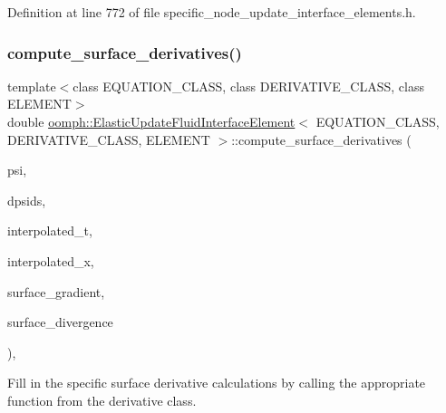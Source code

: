Definition at line 772 of file specific\+\_\+node\+\_\+update\+\_\+interface\+\_\+elements.\+h.

\mbox{\label{classoomph_1_1ElasticUpdateFluidInterfaceElement_ae9df6c11ccb63dc04c0d5ca655fe1482}} 
\subsubsection{\texorpdfstring{compute\+\_\+surface\+\_\+derivatives()}{compute\_surface\_derivatives()}}
{\footnotesize\ttfamily template$<$class E\+Q\+U\+A\+T\+I\+O\+N\+\_\+\+C\+L\+A\+SS, class D\+E\+R\+I\+V\+A\+T\+I\+V\+E\+\_\+\+C\+L\+A\+SS, class E\+L\+E\+M\+E\+NT$>$ \\
double \hyperlink{classoomph_1_1ElasticUpdateFluidInterfaceElement}{oomph\+::\+Elastic\+Update\+Fluid\+Interface\+Element}$<$ E\+Q\+U\+A\+T\+I\+O\+N\+\_\+\+C\+L\+A\+SS, D\+E\+R\+I\+V\+A\+T\+I\+V\+E\+\_\+\+C\+L\+A\+SS, E\+L\+E\+M\+E\+NT $>$\+::compute\+\_\+surface\+\_\+derivatives (\begin{DoxyParamCaption}\item[{const \hyperlink{classoomph_1_1Shape}{Shape} \&}]{psi,  }\item[{const \hyperlink{classoomph_1_1DShape}{D\+Shape} \&}]{dpsids,  }\item[{const \hyperlink{classoomph_1_1DenseMatrix}{Dense\+Matrix}$<$ double $>$ \&}]{interpolated\+\_\+t,  }\item[{const \hyperlink{classoomph_1_1Vector}{Vector}$<$ double $>$ \&}]{interpolated\+\_\+x,  }\item[{\hyperlink{classoomph_1_1DShape}{D\+Shape} \&}]{surface\+\_\+gradient,  }\item[{\hyperlink{classoomph_1_1DShape}{D\+Shape} \&}]{surface\+\_\+divergence }\end{DoxyParamCaption})\hspace{0.3cm}{\ttfamily [inline]}, {\ttfamily [protected]}}



Fill in the specific surface derivative calculations by calling the appropriate function from the derivative class. 



